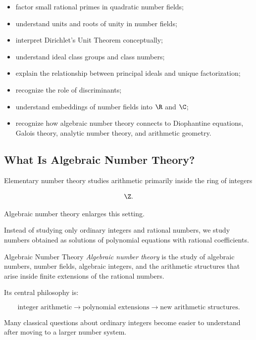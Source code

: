 {\begin{itemize}
    \item factor small rational primes in quadratic number fields;
    \item understand units and roots of unity in number fields;
    \item interpret Dirichlet's Unit Theorem conceptually;
    \item understand ideal class groups and class numbers;
    \item explain the relationship between principal ideals and unique factorization;
    \item recognize the role of discriminants;
    \item understand embeddings of number fields into \(\R\) and \(\C\);
    \item recognize how algebraic number theory connects to Diophantine equations,
    Galois theory, analytic number theory, and arithmetic geometry.
\end{itemize}
}

\subsection{What Is Algebraic Number Theory?}
\label{subsec:what-is-algebraic-number-theory}

Elementary number theory studies arithmetic primarily inside the ring of
integers

\[ \Z. \]

Algebraic number theory enlarges this setting.

Instead of studying only ordinary integers and rational numbers, we study
numbers obtained as solutions of polynomial equations with rational
coefficients.

\begin{definitionbox}{Algebraic Number Theory}
\emph{Algebraic number theory} is the study of algebraic numbers, number
fields, algebraic integers, and the arithmetic structures that arise inside
finite extensions of the rational numbers.
\end{definitionbox}

Its central philosophy is:

\[
\boxed{
\text{integer arithmetic}
\longrightarrow
\text{polynomial extensions}
\longrightarrow
\text{new arithmetic structures}.
}
\]

Many classical questions about ordinary integers become easier to understand
after moving to a larger number system.

